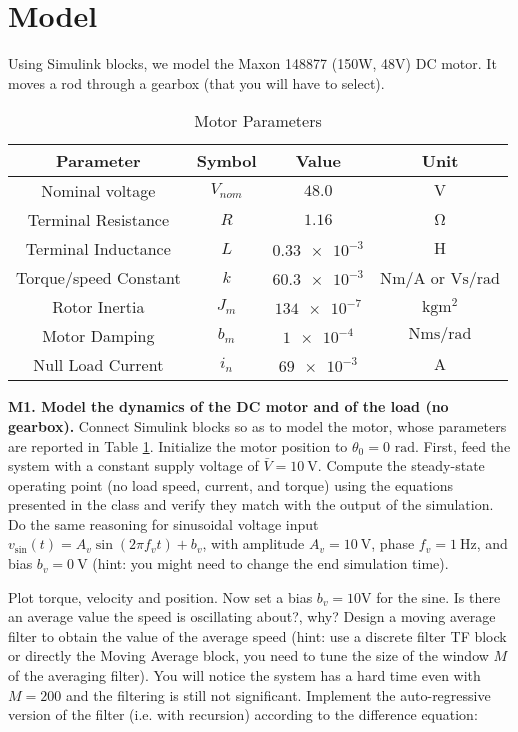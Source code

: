 \documentclass[11pt]{article}
\begin{document}
\section{Model}
Using Simulink blocks, we model the Maxon 148877 (150W, 48V) DC motor. It moves a rod through a gearbox (that you will have to select).
%
\begin{table}[bth]
	\centering
	\begin{tabular}{cccc}
		Parameter       & Symbol      & Value & Unit\\
		\hline \hline
		Nominal voltage & $V_{nom}$ & $48.0$ & $\mathrm{V}$\\
		Terminal Resistance & $R$ & $1.16$ & $\mathrm{\Omega}$ \\
		Terminal Inductance & $L$ & $\num{0.33e-3}$ & $\mathrm{H}$ \\
		Torque/speed Constant & $k$  & $\num{60.3e-3}$ & $\mathrm{Nm/A}$ or $\mathrm{Vs/rad}$ \\
		Rotor Inertia & $J_m$ & $\num{134e-7}$ & $\mathrm{kgm^2}$ \\
		Motor Damping & $b_m$ & $\num{1e-4}$ & $\mathrm{Nms/rad}$ \\
		Null Load Current & $i_n$ & $\num{69e-3}$ & $\mathrm{A}$ 
	\end{tabular}
	\caption{Motor Parameters}
	\label{motor_data}
\end{table}

%
\par
\textbf{M1. Model the dynamics of the DC motor and of the load (no gearbox).} 
Connect Simulink blocks so as to model the motor, whose parameters are reported in Table \ref{motor_data}. 
Initialize the motor position to $\theta_0 = 0$   $\mathrm{rad}$. First, feed the system with a constant supply voltage of $\bar{V} = 10 \ \mathrm{V}$. 
Compute the steady-state operating point (no load speed, current, and torque) using the equations presented in the class and verify they match with the output of the simulation. %
Do the same reasoning for sinusoidal voltage input $v_{\sin} (t) = A_v\sin(2 \pi f_v t)+b_v$, 
with amplitude $A_v = 10 \ \mathrm{V}$, phase $f_v = 1 \ \mathrm{Hz}$, and bias $b_v = 0 \ \mathrm{V}$ (hint: you might need to change the end simulation time).

Plot torque, velocity and position. Now set a  bias $b_v = 10 \mathrm{V}$ for the sine. 
Is there an average value the speed is oscillating about?, why? 
Design a moving average filter to obtain the value of the average speed (hint: use a 
discrete filter TF block or directly the Moving Average block, you need to tune the 
size of the window $M$ of the averaging filter). You will notice the system has a hard 
time even with $M = 200$ and the filtering is still not significant. 
Implement the auto-regressive version of the filter (i.e. with recursion) according to the difference equation:
\end{document}
